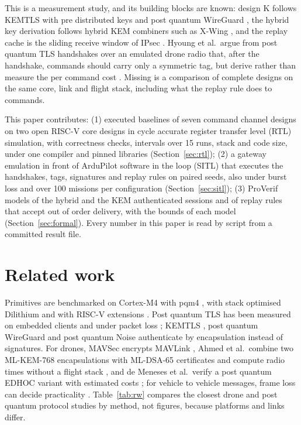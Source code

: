 \documentclass[conference]{IEEEtran}
\begin{document}
This is a measurement study, and its building blocks are known: design K follows KEMTLS with pre distributed keys and post quantum WireGuard \cite{kemtlspdk21,pqwg21}, the hybrid key derivation follows hybrid KEM combiners such as X-Wing \cite{xwing24}, and the replay cache is the sliding receive window of IPsec \cite{rfc4303}. Hyoung et al.\ argue from post quantum TLS handshakes over an emulated drone radio that, after the handshake, commands should carry only a symmetric tag, but derive rather than measure the per command cost \cite{hyoung26}. Missing is a comparison of complete designs on the same core, link and flight stack, including what the replay rule does to commands.

This paper contributes:
(1) executed baselines of seven command channel designs on two open RISC-V core designs in cycle accurate register transfer level (RTL) simulation, with correctness checks, intervals over 15 runs, stack and code size, under one compiler and pinned libraries (Section~\ref{sec:rtl});
(2) a gateway emulation in front of ArduPilot software in the loop (SITL) that executes the handshakes, tags, signatures and replay rules on paired seeds, also under burst loss and over 100 missions per configuration (Section~\ref{sec:sitl});
(3) ProVerif models of the hybrid and the KEM authenticated sessions and of replay rules that accept out of order delivery, with the bounds of each model (Section~\ref{sec:formal}).
Every number in this paper is read by script from a committed result file.

\section{Related work}
\label{sec:rw}
Primitives are benchmarked on Cortex-M4 with pqm4 \cite{pqm4}, with stack optimised Dilithium \cite{greconici21} and with RISC-V extensions \cite{alkim20,fritzmann20}. Post quantum TLS has been measured on embedded clients \cite{burstinghaus20} and under packet loss \cite{paquin20,sikeridis20}; KEMTLS \cite{kemtls20,kemtlspdk21}, post quantum WireGuard and post quantum Noise \cite{pqwg21,pqnoise22} authenticate by encapsulation instead of signatures. For drones, MAVSec encrypts MAVLink \cite{mavsec19}, Ahmed et al.\ combine two ML-KEM-768 encapsulations with ML-DSA-65 certificates and compute radio times without a flight stack \cite{ahmed26}, and de Meneses et al.\ verify a post quantum EDHOC variant with estimated costs \cite{meneses26}; for vehicle to vehicle messages, frame loss can decide practicality \cite{twardokus24}. Table~\ref{tab:rw} compares the closest drone and post quantum protocol studies by method, not figures, because platforms and links differ.
\end{document}
